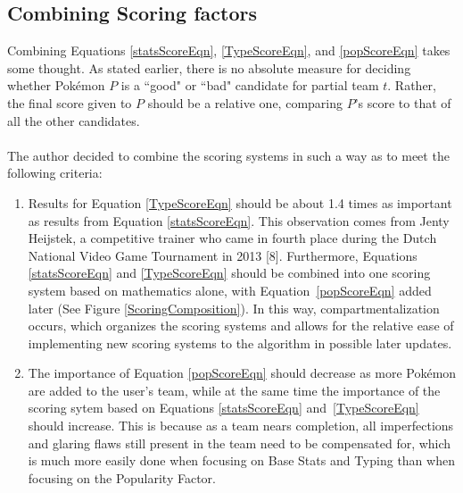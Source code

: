 \documentclass{article}
\begin{document}
\subsection{Combining Scoring factors}
Combining Equations \ref{statsScoreEqn}, \ref{TypeScoreEqn}, and \ref{popScoreEqn} takes some thought. As stated earlier, there is no absolute measure for deciding whether Pok\'emon $P$ is a ``good" or ``bad" candidate for partial team $t$. Rather, the final score given to $P$ should be a relative one, comparing $P$'s score to that of all the other candidates.\\\\
The author decided to combine the scoring systems in such a way as to meet the following criteria:
\begin{enumerate}
	\item Results for Equation \ref{TypeScoreEqn} should be about 1.4 times as important as results from Equation \ref{statsScoreEqn}. This observation comes from Jenty Heijstek, a competitive trainer who came in fourth place during the Dutch National Video Game Tournament in 2013 [8]. Furthermore, Equations \ref{statsScoreEqn} and \ref{TypeScoreEqn} should be combined into one scoring system based on mathematics alone, with Equation~\ref{popScoreEqn} added later (See Figure \ref{ScoringComposition}). In this way, compartmentalization occurs, which organizes the scoring systems and allows for the relative ease of implementing new scoring systems to the algorithm in possible later updates.
	\item The importance of Equation \ref{popScoreEqn} should decrease as more Pok\'emon are added to the user's team, while at the same time the importance of the scoring sytem based on Equations \ref{statsScoreEqn} and~\ref{TypeScoreEqn} should increase. This is because as a team nears completion, all imperfections and glaring flaws still present in the team need to be compensated for, which is much more easily done when focusing on Base Stats and Typing than when focusing on the Popularity Factor. 
\end{enumerate}
\end{document}
